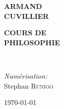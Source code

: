 \begin{titlepage}
%
~\\[1cm]

\textsc{\Large }\\[0.5cm]


\begin{center}
{\large \bfseries  ARMAND  \\
\Huge CUVILLIER \\}
\end{center}

\HRule
\begin{center}
{\Large \bfseries COURS DE\\
\huge PHILOSOPHIE\\}
\end{center}

\HRule \\[1.5cm]

\begin{center}
\end{center}

\begin{center}
\end{center}


\begin{minipage}{0.4\textwidth}
\begin{flushleft} \large
\end{flushleft}
\end{minipage}
\begin{minipage}{0.4\textwidth}
\begin{flushright} \large
\emph{Numérisation:}\\
Stephan \textsc{Runigo}
\end{flushright}
\end{minipage}

\vfill

{\large \today}

\end{titlepage}
